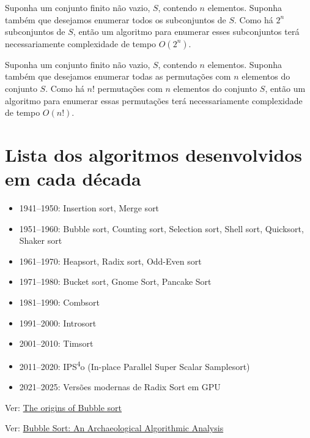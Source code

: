 
\begin{exmp}
Suponha um conjunto finito não vazio, $S$, contendo $n$ elementos. Suponha também que desejamos enumerar todos os subconjuntos de $S$. Como há $2^n$ subconjuntos de $S$, então um algoritmo para enumerar esses subconjuntos terá necessariamente complexidade de tempo $O(2^n)$.   
\end{exmp}


\begin{exmp}
Suponha um conjunto finito não vazio, $S$, contendo $n$ elementos. Suponha também que desejamos enumerar todas as permutações com $n$ elementos do conjunto $S$. Como há $n!$ permutações com $n$ elementos do conjunto $S$, então um algoritmo para enumerar essas permutações terá necessariamente complexidade de tempo $O(n!)$.   
\end{exmp}

\section{Lista dos algoritmos desenvolvidos em cada década}

\begin{itemize}
    \item 1941--1950: Insertion sort, Merge sort
    \item 1951--1960: Bubble sort, Counting sort, Selection sort, Shell sort, Quicksort, Shaker sort
    \item 1961--1970: Heapsort, Radix sort, Odd-Even sort
    \item 1971--1980: Bucket sort, Gnome Sort, Pancake Sort
    \item 1981--1990: Combsort
    \item 1991--2000: Introsort
    \item 2001--2010: Timsort
    \item 2011--2020: IPS\textsuperscript{4}o (In-place Parallel Super Scalar Samplesort)
    \item 2021--2025: Versões modernas de Radix Sort em GPU
\end{itemize}

Ver:
\href{https://craftofcoding.wordpress.com/2021/09/22/the-origins-of-bubble-sort/}{The origins of Bubble sort}

Ver: \href{https://users.cs.duke.edu/~ola/bubble/bubble.html}{Bubble Sort: An Archaeological Algorithmic Analysis}

